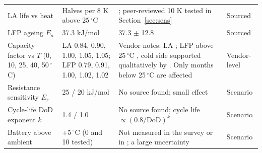 \begin{table}[t]
\begin{tabular}{p{2.5cm}p{3.3cm}p{6.8cm}p{1.8cm}}
LA life vs heat & Halves per 8 K above 25\,$^\circ$C & \cite{bu806a}; peer-reviewed 10 K \cite{tsujikawa2009} tested in Section~\ref{sec:sens} & Sourced \\
LFP ageing $E_a$ & 37.3 kJ/mol & 37.3 $\pm$ 12.8 \cite{yagci2026} & Sourced \\
Capacity factor vs $T$ (0, 10, 25, 40, 50\,$^\circ$C) & LA 0.84, 0.90, 1.00, 1.05, 1.05; LFP 0.79, 0.91, 1.00, 1.02, 1.02 & Vendor notes: LA \cite{discoverbattery}; LFP above 25\,$^\circ$C \cite{bonnen2026}, cold side supported qualitatively by \cite{bauknecht2023}. Only months below 25\,$^\circ$C are affected & Vendor-level \\
Resistance sensitivity $E_r$ & 25 / 20 kJ/mol & No source found; small effect & Scenario \\
Cycle-life DoD exponent $k$ & 1.4 / 1.0 & No source found; cycle life $\propto (0.8/\mathrm{DoD})^k$ & Scenario \\
Battery above ambient & +5\,$^\circ$C (0 and 10 tested) & Not measured in the survey or in \cite{chowdhury2026}; a large uncertainty & Scenario \\
\hline
\end{tabular}
\end{table}
